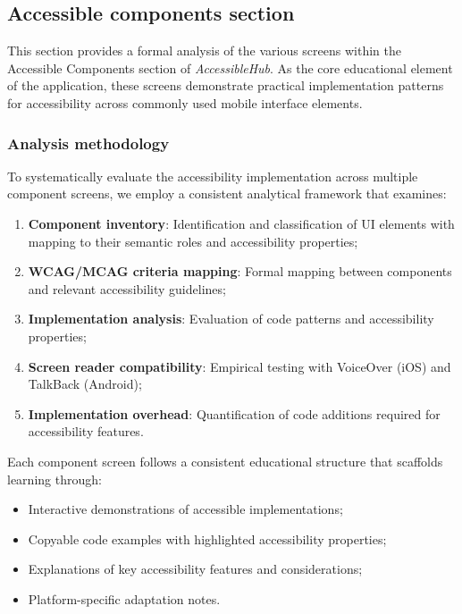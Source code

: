 \subsection{Accessible components section}
\label{subsec:accessible-components}

This section provides a formal analysis of the various screens within the Accessible Components section of \textit{AccessibleHub}. As the core educational element of the application, these screens demonstrate practical implementation patterns for accessibility across commonly used mobile interface elements. 

\subsubsection{Analysis methodology}
\label{subsubsec:components-methodology}

To systematically evaluate the accessibility implementation across multiple component screens, we employ a consistent analytical framework that examines:

\begin{enumerate}
    \item \textbf{Component inventory}: Identification and classification of UI elements with mapping to their semantic roles and accessibility properties;
    
    \item \textbf{WCAG/MCAG criteria mapping}: Formal mapping between components and relevant accessibility guidelines;
    
    \item \textbf{Implementation analysis}: Evaluation of code patterns and accessibility properties;
    
    \item \textbf{Screen reader compatibility}: Empirical testing with VoiceOver (iOS) and TalkBack (Android);
    
    \item \textbf{Implementation overhead}: Quantification of code additions required for accessibility features.
\end{enumerate}

Each component screen follows a consistent educational structure that scaffolds learning through:

\begin{itemize}
    \item Interactive demonstrations of accessible implementations;
    \item Copyable code examples with highlighted accessibility properties;
    \item Explanations of key accessibility features and considerations;
    \item Platform-specific adaptation notes.
\end{itemize}

